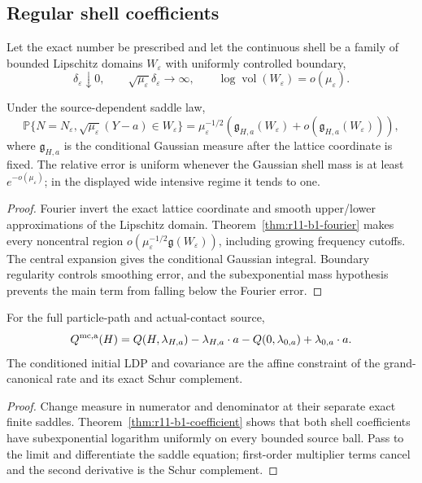 \subsection{Regular shell coefficients}
Let the exact number be prescribed and let the continuous shell be a family of
bounded Lipschitz domains $W_\varepsilon$ with uniformly controlled boundary,
\[
 \delta_\varepsilon\downarrow0,
 \qquad \sqrt{\mu_\varepsilon}\delta_\varepsilon\to\infty,
 \qquad \log\operatorname{vol}(W_\varepsilon)=o(\mu_\varepsilon).
\]

\begin{theorem}
\label{thm:r11-b1-coefficient}
Under the source-dependent saddle law,
\[
 \mathbb P\{N=N_\varepsilon,
 \sqrt{\mu_\varepsilon}(Y-a)\in W_\varepsilon\}
 =\mu_\varepsilon^{-1/2}
 \left(\mathfrak g_{H,a}(W_\varepsilon)+o(
       \mathfrak g_{H,a}(W_\varepsilon))\right),
\]
where $\mathfrak g_{H,a}$ is the conditional Gaussian measure after the
lattice coordinate is fixed.  The relative error is uniform whenever the
Gaussian shell mass is at least $e^{-o(\mu_\varepsilon)}$; in the displayed
wide intensive regime it tends to one.
\end{theorem}

\begin{proof}
Fourier invert the exact lattice coordinate and smooth upper/lower
approximations of the Lipschitz domain.  Theorem~\ref{thm:r11-b1-fourier}
makes every noncentral region
$o(\mu_\varepsilon^{-1/2}\mathfrak g(W_\varepsilon))$, including growing
frequency cutoffs.  The central expansion gives the conditional Gaussian
integral.  Boundary regularity controls smoothing error, and the
subexponential mass hypothesis prevents the main term from falling below the
Fourier error.
\end{proof}

\begin{theorem}
\label{thm:r11-b1-transfer}
For the full particle-path and actual-contact source,
\[
 Q^{\rm mc,a}(H)=
 Q(H,\lambda_{H,a})-\lambda_{H,a}\cdot a
 -Q(0,\lambda_{0,a})+\lambda_{0,a}\cdot a.
\]
The conditioned initial LDP and covariance are the affine constraint of the
grand-canonical rate and its exact Schur complement.
\end{theorem}

\begin{proof}
Change measure in numerator and denominator at their separate exact finite
saddles.  Theorem~\ref{thm:r11-b1-coefficient} shows that both shell
coefficients have subexponential logarithm uniformly on every bounded source
ball.  Pass to the limit and differentiate the saddle equation; first-order
multiplier terms cancel and the second derivative is the Schur complement.
\end{proof}

